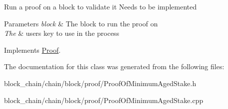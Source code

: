 Run a proof on a block to validate it Needs to be implemented


\begin{DoxyParams}{Parameters}
{\em block} & The block to run the proof on \\
\hline
{\em The} & user\textquotesingle{}s key to use in the process \\
\hline
\end{DoxyParams}


Implements \mbox{\hyperlink{classProof_a8a43fcb7c997da54d627e0f257adb86f}{Proof}}.



The documentation for this class was generated from the following files\+:\begin{DoxyCompactItemize}
\item 
block\+\_\+chain/chain/block/proof/Proof\+Of\+Minimum\+Aged\+Stake.\+h\item 
block\+\_\+chain/chain/block/proof/Proof\+Of\+Minimum\+Aged\+Stake.\+cpp\end{DoxyCompactItemize}
